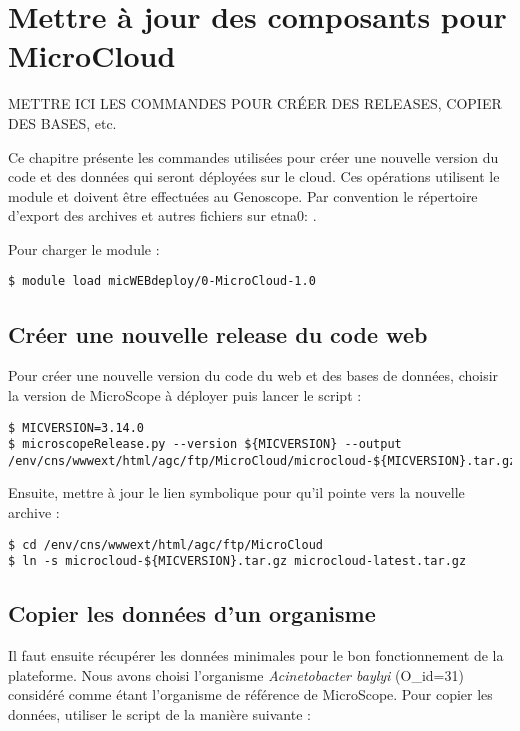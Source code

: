 \chapter{Mettre à jour des composants pour MicroCloud} \label{chap:creer_nouvelle_version}

\begin{mycolorbox}
	METTRE ICI LES COMMANDES POUR CRÉER DES RELEASES, COPIER DES BASES, etc.
\end{mycolorbox}

Ce chapitre présente les commandes utilisées pour créer une nouvelle version
du code et des données qui seront déployées sur le cloud.
Ces opérations utilisent le module \micWEBdeployVer
et doivent être effectuées au Genoscope.
Par convention le répertoire d'export des archives et autres fichiers sur etna0: .
\bigskip

Pour charger le module \micWEBdeployVer:
\begin{lstlisting}[style=bash]
$ module load micWEBdeploy/0-MicroCloud-1.0
\end{lstlisting}

\section{Créer une nouvelle release du code web}

Pour créer une nouvelle version du code du web et des bases de données, choisir la version de MicroScope à déployer puis lancer le script  :
\begin{lstlisting}[style=bash]
$ MICVERSION=3.14.0
$ microscopeRelease.py --version ${MICVERSION} --output /env/cns/wwwext/html/agc/ftp/MicroCloud/microcloud-${MICVERSION}.tar.gz
\end{lstlisting}

Ensuite, mettre à jour le lien symbolique pour qu'il pointe vers la nouvelle archive :
\begin{lstlisting}[style=bash]
$ cd /env/cns/wwwext/html/agc/ftp/MicroCloud
$ ln -s microcloud-${MICVERSION}.tar.gz microcloud-latest.tar.gz
\end{lstlisting}

\section{Copier les données d'un organisme}

Il faut ensuite récupérer les données minimales pour le bon fonctionnement de la plateforme. Nous avons choisi l'organisme \textit{Acinetobacter baylyi} (O\_id=31) considéré comme étant l'organisme de référence de MicroScope. Pour copier les données, utiliser le script  de la manière suivante :

